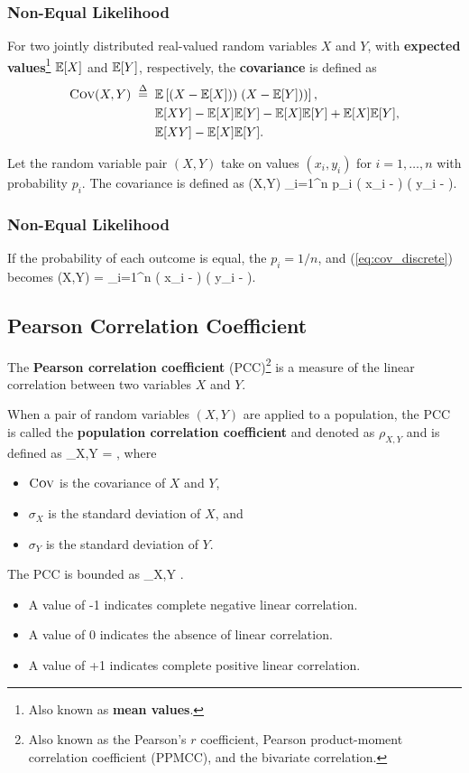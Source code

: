 \subsubsection{Non-Equal Likelihood}

For two jointly distributed real-valued random variables $X$ and $Y$, with
{\bf expected values}\footnote{Also known as {\bf mean values}.} 
$\mathbb{E}[X]$ and $\mathbb{E}[Y]$, respectively, the {\bf covariance} is defined as
\begin{align}
\mbox{\sc Cov}(X,Y) \; \stackrel{\Delta}{=} \; & \; \mathbb{E}\left[ 
(X - \mathbb{E}[X])) \; (X - \mathbb{E}[Y]))
\right], \\
 & \; \mathbb{E}[XY] - \mathbb{E}[X] \mathbb{E}[Y] - \mathbb{E}[X] \mathbb{E}[Y] + \mathbb{E}[X] \mathbb{E}[Y], \\
 & \; \mathbb{E}[XY] - \mathbb{E}[X] \mathbb{E}[Y].
\end{align}

Let the random variable pair $(X,Y)$ take on values $(x_i, y_i)$ for
$i=1,\ldots,n$ with probability $p_i$.  The covariance is defined as
\be
\cov(X,Y)  \sum_{i=1}^n \; p_i \; \left(
x_i - \ex
\right)
\;
\left(
y_i - \ey
\right).
\label{eq:cov_discrete}
\ee

\subsubsection{Non-Equal Likelihood}
If the probability of each outcome is equal, the $p_i = 1/n$, and
(\ref{eq:cov_discrete}) becomes
\be
\cov(X,Y) =  \; \sum_{i=1}^n \; \left(
x_i - \ex
\right)
\;
\left(
y_i - \ey
\right).
\label{eq:cov_discrete_equal}
\ee

\subsection{Pearson Correlation Coefficient}
The {\bf Pearson correlation coefficient} (PCC)\footnote{Also known as the
Pearson's $r$ coefficient, Pearson product-moment correlation
coefficient (PPMCC), and the bivariate correlation.} is a 
measure of the linear correlation between two variables 
$X$ and $Y$.  

When a pair of random variables $(X,Y)$ are applied to a population, the PCC
is called the {\bf population correlation coefficient} and denoted as 
$\rho_{X,Y}$ and is defined as 
\be
\rho_{X,Y} = , 
\ee
where 
\begin{itemize}
\item $\mbox{\sc Cov}$ is the covariance of $X$ and $Y$, 
\item $\sigma_X$ is the standard deviation of $X$, and 
\item $\sigma_Y$ is the standard deviation of $Y$.
\end{itemize}
The PCC is bounded as
 \leq \rho_{X,Y} .
\ee
\begin{itemize}
\item A value of -1 indicates complete negative linear correlation.
\item A value of  0 indicates the absence of linear correlation.
\item A value of +1 indicates complete positive linear correlation.
\end{itemize}


